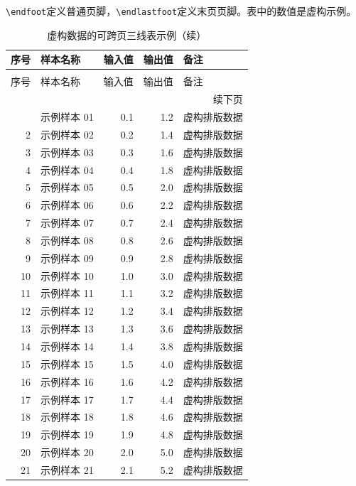 \documentclass[bwprint]{gmcmthesis}
\numberwithin{figure}{section}
\numberwithin{table}{section}
\numberwithin{equation}{section}
\begin{document}
\verb|\endfoot|定义普通页脚，\verb|\endlastfoot|定义末页页脚。表中的数值是虚构示例。
\begingroup
\small
\setlength{\tabcolsep}{6pt}
\renewcommand{\arraystretch}{1.25}
\begin{longtable}{@{}r p{.28\linewidth} r r p{.24\linewidth}@{}}
\caption{虚构数据的可跨页三线表示例}\label{tab:long-example}\\
\toprule
序号 & 样本名称 & 输入值 & 输出值 & 备注 \\
\midrule
\endfirsthead
\caption[]{虚构数据的可跨页三线表示例（续）}\\
\toprule
序号 & 样本名称 & 输入值 & 输出值 & 备注 \\
\midrule
\endhead
\midrule
\multicolumn{5}{r}{续下页}\\
\endfoot
\bottomrule
\endlastfoot
1 & 示例样本 01 & 0.1 & 1.2 & 虚构排版数据 \\
2 & 示例样本 02 & 0.2 & 1.4 & 虚构排版数据 \\
3 & 示例样本 03 & 0.3 & 1.6 & 虚构排版数据 \\
4 & 示例样本 04 & 0.4 & 1.8 & 虚构排版数据 \\
5 & 示例样本 05 & 0.5 & 2.0 & 虚构排版数据 \\
6 & 示例样本 06 & 0.6 & 2.2 & 虚构排版数据 \\
7 & 示例样本 07 & 0.7 & 2.4 & 虚构排版数据 \\
8 & 示例样本 08 & 0.8 & 2.6 & 虚构排版数据 \\
9 & 示例样本 09 & 0.9 & 2.8 & 虚构排版数据 \\
10 & 示例样本 10 & 1.0 & 3.0 & 虚构排版数据 \\
11 & 示例样本 11 & 1.1 & 3.2 & 虚构排版数据 \\
12 & 示例样本 12 & 1.2 & 3.4 & 虚构排版数据 \\
13 & 示例样本 13 & 1.3 & 3.6 & 虚构排版数据 \\
14 & 示例样本 14 & 1.4 & 3.8 & 虚构排版数据 \\
15 & 示例样本 15 & 1.5 & 4.0 & 虚构排版数据 \\
16 & 示例样本 16 & 1.6 & 4.2 & 虚构排版数据 \\
17 & 示例样本 17 & 1.7 & 4.4 & 虚构排版数据 \\
18 & 示例样本 18 & 1.8 & 4.6 & 虚构排版数据 \\
19 & 示例样本 19 & 1.9 & 4.8 & 虚构排版数据 \\
20 & 示例样本 20 & 2.0 & 5.0 & 虚构排版数据 \\
21 & 示例样本 21 & 2.1 & 5.2 & 虚构排版数据 \\

\end{longtable}
\end{document}
